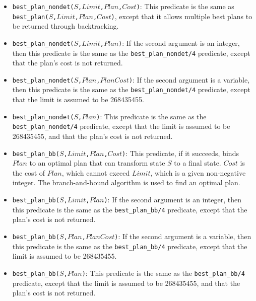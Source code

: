 \begin{itemize}
\item \texttt{best\_plan\_nondet($S$,$Limit$,$Plan$,$Cost$)}: This predicate is the same as \\\texttt{best\_plan($S$,$Limit$,$Plan$,$Cost$)}, except that it allows multiple best plans to be returned through backtracking.

\item \texttt{best\_plan\_nondet($S$,$Limit$,$Plan$)}: If the second argument is an integer, then this predicate is the same as the \texttt{best\_plan\_nondet/4} predicate, except that the plan's cost is not returned. 

\item \texttt{best\_plan\_nondet($S$,$Plan$,$PlanCost$)}: If the second argument is a variable, then this predicate is the same as the \texttt{best\_plan\_nondet/4} predicate, except that the limit is assumed to be 268435455.

\item \texttt{best\_plan\_nondet($S$,$Plan$)}: This predicate is the same as the \texttt{best\_plan\_nondet/4} predicate, except that the limit is assumed to be 268435455, and that the plan's cost is not returned.

\item \texttt{best\_plan\_bb($S$,$Limit$,$Plan$,$Cost$)}: 
This predicate, if it succeeds, binds $Plan$ to an optimal plan that can transform state $S$ to a final state. $Cost$ is the cost of $Plan$, which cannot exceed $Limit$, which is a given non-negative integer. The branch-and-bound algorithm is used to find an optimal plan.

\item \texttt{best\_plan\_bb($S$,$Limit$,$Plan$)}: If the second argument is an integer, then this predicate is the same as the \texttt{best\_plan\_bb/4} predicate, except that the plan's cost is not returned. 

\item \texttt{best\_plan\_bb($S$,$Plan$,$PlanCost$)}: If the second argument is a variable, then this predicate is the same as the \texttt{best\_plan\_bb/4} predicate, except that the limit is assumed to be 268435455.

\item \texttt{best\_plan\_bb($S$,$Plan$)}: 
This predicate is the same as the \texttt{best\_plan\_bb/4} predicate, except that the limit is assumed to be 268435455, and that the plan's cost is not returned.


\end{itemize}
